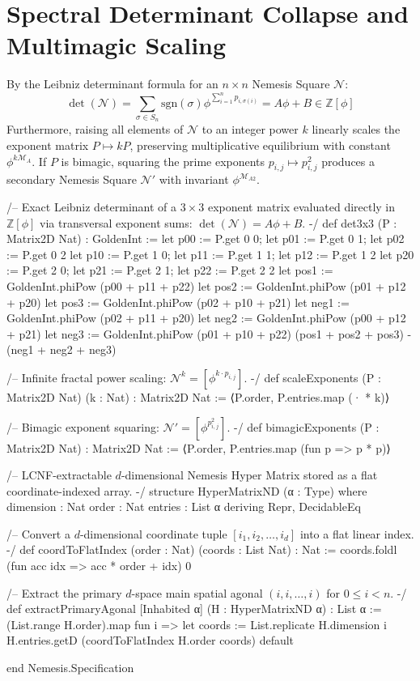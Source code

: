 \documentclass{article}
\begin{document}
\section{Spectral Determinant Collapse and Multimagic Scaling}
By the Leibniz determinant formula for an $n \times n$ Nemesis Square $\mathcal{N}$:
$$\det(\mathcal{N}) = \sum_{\sigma \in S_n} \text{sgn}(\sigma) \phi^{\sum_{i=1}^n p_{i, \sigma(i)}} = A\phi + B \in \mathbb{Z}[\phi]$$
Furthermore, raising all elements of $\mathcal{N}$ to an integer power $k$ linearly scales the exponent matrix $P \mapsto kP$, preserving multiplicative equilibrium with constant $\phi^{k \mathcal{M}_A}$. If $P$ is bimagic, squaring the prime exponents $p_{i,j} \mapsto p_{i,j}^2$ produces a secondary Nemesis Square $\mathcal{N}'$ with invariant $\phi^{\mathcal{M}_{A2}}$.

\begin{lean}
/-- Exact Leibniz determinant of a $3 \times 3$ exponent matrix evaluated directly in $\mathbb{Z}[\phi]$
    via transversal exponent sums: $\det(\mathcal{N}) = A\phi + B$. -/
def det3x3 (P : Matrix2D Nat) : GoldenInt :=
  let p00 := P.get 0 0; let p01 := P.get 0 1; let p02 := P.get 0 2
  let p10 := P.get 1 0; let p11 := P.get 1 1; let p12 := P.get 1 2
  let p20 := P.get 2 0; let p21 := P.get 2 1; let p22 := P.get 2 2
  let pos1 := GoldenInt.phiPow (p00 + p11 + p22)
  let pos2 := GoldenInt.phiPow (p01 + p12 + p20)
  let pos3 := GoldenInt.phiPow (p02 + p10 + p21)
  let neg1 := GoldenInt.phiPow (p02 + p11 + p20)
  let neg2 := GoldenInt.phiPow (p00 + p12 + p21)
  let neg3 := GoldenInt.phiPow (p01 + p10 + p22)
  (pos1 + pos2 + pos3) - (neg1 + neg2 + neg3)

/-- Infinite fractal power scaling: $\mathcal{N}^k = [\phi^{k \cdot p_{i,j}}]$. -/
def scaleExponents (P : Matrix2D Nat) (k : Nat) : Matrix2D Nat :=
  ⟨P.order, P.entries.map (· * k)⟩

/-- Bimagic exponent squaring: $\mathcal{N}' = [\phi^{p_{i,j}^2}]$. -/
def bimagicExponents (P : Matrix2D Nat) : Matrix2D Nat :=
  ⟨P.order, P.entries.map (fun p => p * p)⟩

/-- LCNF-extractable $d$-dimensional Nemesis Hyper Matrix stored as a flat coordinate-indexed array. -/
structure HyperMatrixND (α : Type) where
  dimension : Nat
  order : Nat
  entries : List α
  deriving Repr, DecidableEq

/-- Convert a $d$-dimensional coordinate tuple $[i_1, i_2, \dots, i_d]$ into a flat linear index. -/
def coordToFlatIndex (order : Nat) (coords : List Nat) : Nat :=
  coords.foldl (fun acc idx => acc * order + idx) 0

/-- Extract the primary $d$-space main spatial agonal $(i, i, \dots, i)$ for $0 \le i < n$. -/
def extractPrimaryAgonal [Inhabited α] (H : HyperMatrixND α) : List α :=
  (List.range H.order).map fun i =>
    let coords := List.replicate H.dimension i
    H.entries.getD (coordToFlatIndex H.order coords) default

end Nemesis.Specification
\end{lean}
\end{document}
